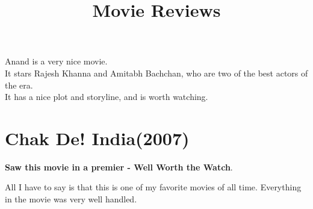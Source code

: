 \documentclass[11pt]{article}
\title{\textbf{Movie Reviews}}
\author{}
\date{}
\begin{document}
\maketitle
{}
Anand is a very nice movie.\\
It stars Rajesh Khanna and Amitabh Bachchan, who are two of the best actors of the era.\\
It has a nice plot and storyline, and is worth watching.

\section*{Chak De! India(2007)}
\textbf{Saw this movie in a premier - Well Worth the Watch}.

All I have to say is that this is one of my favorite movies of all time. Everything in the movie was very well handled.
\end{document}
